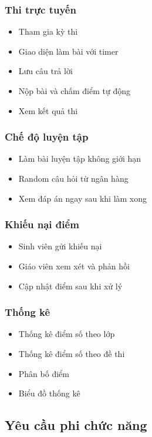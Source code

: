 \documentclass[12pt,a4paper]{report}
\begin{document}
\subsubsection{Thi trực tuyến}
\begin{itemize}
    \item Tham gia kỳ thi
    \item Giao diện làm bài với timer
    \item Lưu câu trả lời
    \item Nộp bài và chấm điểm tự động
    \item Xem kết quả thi
\end{itemize}

\subsubsection{Chế độ luyện tập}
\begin{itemize}
    \item Làm bài luyện tập không giới hạn
    \item Random câu hỏi từ ngân hàng
    \item Xem đáp án ngay sau khi làm xong
\end{itemize}

\subsubsection{Khiếu nại điểm}
\begin{itemize}
    \item Sinh viên gửi khiếu nại
    \item Giáo viên xem xét và phản hồi
    \item Cập nhật điểm sau khi xử lý
\end{itemize}

\subsubsection{Thống kê}
\begin{itemize}
    \item Thống kê điểm số theo lớp
    \item Thống kê điểm số theo đề thi
    \item Phân bố điểm
    \item Biểu đồ thống kê
\end{itemize}

\subsection{Yêu cầu phi chức năng}
\end{document}

